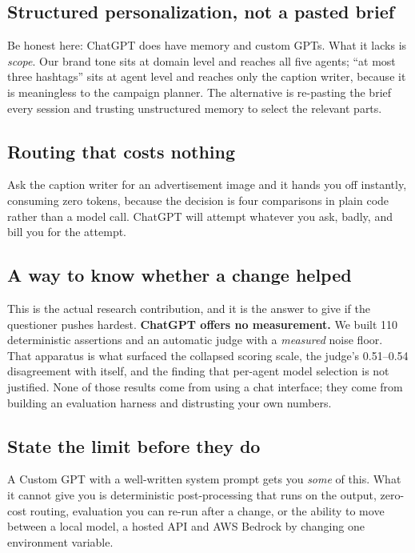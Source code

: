\documentclass[11pt]{article}
\begin{document}
\subsection{Structured personalization, not a pasted brief}

Be honest here: ChatGPT does have memory and custom GPTs. What it lacks is
\emph{scope}. Our brand tone sits at domain level and reaches all five agents;
``at most three hashtags'' sits at agent level and reaches only the caption
writer, because it is meaningless to the campaign planner. The alternative is
re-pasting the brief every session and trusting unstructured memory to select
the relevant parts.

\subsection{Routing that costs nothing}

Ask the caption writer for an advertisement image and it hands you off
instantly, consuming zero tokens, because the decision is four comparisons in
plain code rather than a model call. ChatGPT will attempt whatever you ask,
badly, and bill you for the attempt.

\subsection{A way to know whether a change helped}

This is the actual research contribution, and it is the answer to give if the
questioner pushes hardest. \textbf{ChatGPT offers no measurement.} We built 110
deterministic assertions and an automatic judge with a \emph{measured} noise
floor. That apparatus is what surfaced the collapsed scoring scale, the judge's
0.51--0.54 disagreement with itself, and the finding that per-agent model
selection is not justified. None of those results come from using a chat
interface; they come from building an evaluation harness and distrusting your
own numbers.

\subsection{State the limit before they do}

A Custom GPT with a well-written system prompt gets you \emph{some} of this.
What it cannot give you is deterministic post-processing that runs on the
output, zero-cost routing, evaluation you can re-run after a change, or the
ability to move between a local model, a hosted API and AWS Bedrock by changing
one environment variable.
\end{document}
